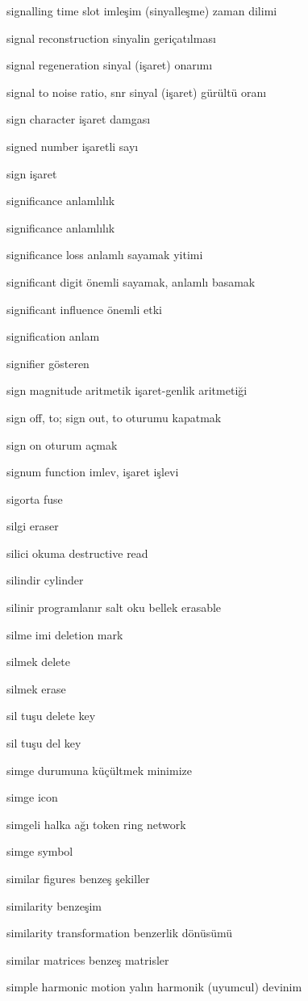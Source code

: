 \documentclass[12pt,fleqn]{article}\usepackage{../../common}
\begin{document}
signalling time slot imleşim (sinyalleşme) zaman dilimi

signal reconstruction sinyalin geriçatılması

signal regeneration sinyal (işaret) onarımı

signal to noise ratio, snr sinyal (işaret) gürültü oranı

sign character işaret damgası

signed number işaretli sayı

sign işaret

significance anlamlılık

significance anlamlılık

significance loss anlamlı sayamak yitimi

significant digit önemli sayamak, anlamlı basamak

significant influence önemli etki

signification anlam

signifier gösteren

sign magnitude aritmetik işaret-genlik aritmetiği

sign off, to; sign out, to oturumu kapatmak

sign on oturum açmak

signum function imlev, işaret işlevi

sigorta fuse

silgi eraser

silici okuma destructive read

silindir cylinder

silinir programlanır salt oku bellek erasable

silme imi deletion mark

silmek delete

silmek erase

sil tuşu delete key

sil tuşu del key

simge durumuna küçültmek minimize

simge icon

simgeli halka ağı token ring network

simge symbol

similar figures benzeş şekiller

similarity benzeşim

similarity transformation benzerlik dönüsümü

similar matrices benzeş matrisler

simple harmonic motion yalın harmonik (uyumcul) devinim
\end{document}
